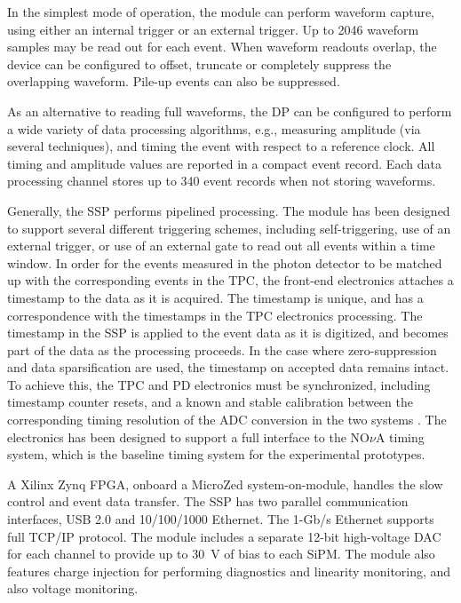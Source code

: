In the simplest mode of operation, the module can perform waveform
capture, using either an internal trigger or an external trigger.  Up
to 2046 waveform samples may be read out for each event.  When
waveform readouts overlap, the device can be configured to offset,
truncate or completely suppress the overlapping waveform.  Pile-up
events can also be suppressed.

As an alternative to reading full waveforms, the DP can be configured
to perform a wide variety of data processing algorithms, e.g., measuring amplitude (via several techniques), and %
timing the
event with respect to a reference clock.  All timing and amplitude
values are reported in a compact event record.  Each data processing
channel stores up to 340 event records when not storing waveforms. 

Generally, the SSP performs pipelined processing.  The module has been
designed to support several different triggering schemes, including
self-triggering, use of an external trigger, or use of an external gate to
read out all events within a time window.  In order for the events
measured in the photon detector to be matched up with the
corresponding events in the TPC, the front-end electronics attaches a
timestamp to the data as it is acquired.  The timestamp is unique, and
has a correspondence with the timestamps in the TPC electronics
processing.  The timestamp in the SSP is applied to the event data as
it is digitized, and becomes part of the data as the processing
proceeds.  In the case where zero-suppression and data sparsification
are used, the timestamp on accepted data remains intact.  To achieve
this, the TPC and PD electronics must be synchronized, including
timestamp counter resets, and a known and stable calibration between
the corresponding timing resolution of the ADC conversion in the two
systems .  The electronics has been designed to support a full
interface to the NO$\nu$A timing system, which is the baseline \fixme{} timing
system for the experimental prototypes.

A Xilinx Zynq FPGA, onboard %
a MicroZed system-on-module,  handles the
slow control and event data transfer.  The SSP has two parallel
communication interfaces, USB 2.0 and 10/100/1000 Ethernet.  The 
1-Gb/s Ethernet supports full TCP/IP protocol.  The module includes a
separate 12-bit high-voltage DAC for each channel to provide up to 
30~V of bias to each SiPM.  The module also features charge injection for
performing diagnostics and linearity monitoring, and also voltage
monitoring. 

